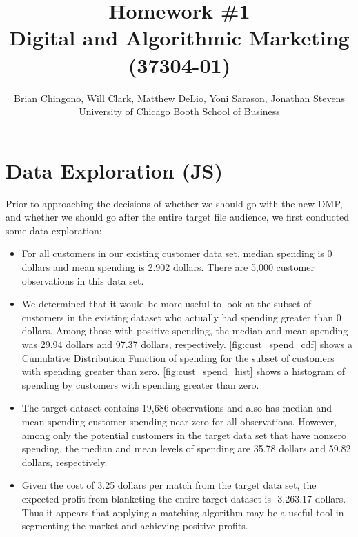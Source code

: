 



\title{Homework \#1\\
Digital and Algorithmic Marketing (37304-01)}
\author{Brian Chingono, Will Clark, Matthew DeLio, Yoni Sarason, Jonathan Stevens\\
University of Chicago Booth School of Business}

\maketitle

\section{Data Exploration (JS)}

Prior to approaching the decisions of whether we should go with the new DMP, and whether we should go after the entire target file audience, we first conducted some data exploration:  
\begin{itemize}

\item For all customers in our existing customer data set, median spending is 0 dollars and mean spending is 2.902 dollars. There are 5,000 customer observations in this data set.

\item We determined that it would be more useful to look at the subset of customers in the existing dataset who actually had spending greater than 0 dollars.  Among those with positive spending, the median and mean spending was 29.94 dollars and 97.37 dollars, respectively.  \vref{fig:cust_spend_cdf} shows a Cumulative Distribution Function of spending for the subset of customers with spending greater than zero. \vref{fig:cust_spend_hist} shows a histogram of spending by customers with spending greater than zero.  

\item The target dataset contains 19,686 observations and also has median and mean spending customer spending near zero for all observations.  However, among only the potential customers in the target data set that have nonzero spending, the median and mean levels of spending are 35.78 dollars and 59.82 dollars, respectively. 

\item Given the cost of 3.25 dollars per match from the target data set, the expected profit from blanketing the entire target dataset is -3,263.17 dollars.  Thus it appears that applying a matching algorithm may be a useful tool in segmenting the market and achieving positive profits.  

\end{itemize}

